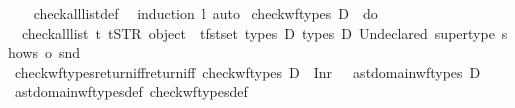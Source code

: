 \begin{isabellebody}
%
\isadelimproof
\ \ %
\endisadelimproof
%
\isatagproof
{}\isamarkupfalse%
\ check{\isacharunderscore}{\kern0pt}all{\isacharunderscore}{\kern0pt}list{\isacharunderscore}{\kern0pt}def\ \isamarkupfalse%
\ {\isacharparenleft}{\kern0pt}induction\ l{\isacharparenright}{\kern0pt}\ {\isacharparenleft}{\kern0pt}auto{\isacharparenright}{\kern0pt}%
\endisatagproof
{\isafoldproof}%
%
\isadelimproof
\isanewline
%
\endisadelimproof
\isanewline
{}\isamarkupfalse%
\ {\isachardoublequoteopen}check{\isacharunderscore}{\kern0pt}wf{\isacharunderscore}{\kern0pt}types\ D\ {\isasymequiv}\ do\ {\isacharbraceleft}{\kern0pt}\isanewline
\ \ check{\isacharunderscore}{\kern0pt}all{\isacharunderscore}{\kern0pt}list\ {\isacharparenleft}{\kern0pt}{\isasymlambda}{\isacharparenleft}{\kern0pt}{\isacharunderscore}{\kern0pt}{\isacharcomma}{\kern0pt}t{\isacharparenright}{\kern0pt}{\isachardot}{\kern0pt}\ t{\isacharequal}{\kern0pt}{\isacharparenleft}{\kern0pt}STR\ {\isacharprime}{\kern0pt}{\isacharprime}{\kern0pt}object{\isacharprime}{\kern0pt}{\isacharprime}{\kern0pt}{\isacharparenright}{\kern0pt}\ {\isasymor}\ t{\isasymin}fst{\isacharbackquote}{\kern0pt}set\ {\isacharparenleft}{\kern0pt}types\ D{\isacharparenright}{\kern0pt}{\isacharparenright}{\kern0pt}\ {\isacharparenleft}{\kern0pt}types\ D{\isacharparenright}{\kern0pt}\ {\isacharprime}{\kern0pt}{\isacharprime}{\kern0pt}Undeclared\ supertype{\isacharprime}{\kern0pt}{\isacharprime}{\kern0pt}\ {\isacharparenleft}{\kern0pt}shows\ o\ snd{\isacharparenright}{\kern0pt}\isanewline
{\isacharbraceright}{\kern0pt}{\isachardoublequoteclose}\isanewline
\isanewline
{}\isamarkupfalse%
\ check{\isacharunderscore}{\kern0pt}wf{\isacharunderscore}{\kern0pt}types{\isacharunderscore}{\kern0pt}return{\isacharunderscore}{\kern0pt}iff{\isacharbrackleft}{\kern0pt}return{\isacharunderscore}{\kern0pt}iff{\isacharbrackright}{\kern0pt}{\isacharcolon}{\kern0pt}\ {\isachardoublequoteopen}check{\isacharunderscore}{\kern0pt}wf{\isacharunderscore}{\kern0pt}types\ D\ {\isacharequal}{\kern0pt}\ Inr\ {\isacharparenleft}{\kern0pt}{\isacharparenright}{\kern0pt}\ {\isasymlongleftrightarrow}\ ast{\isacharunderscore}{\kern0pt}domain{\isachardot}{\kern0pt}wf{\isacharunderscore}{\kern0pt}types\ D{\isachardoublequoteclose}\isanewline
%
\isadelimproof
\ \ %
\endisadelimproof
%
\isatagproof
{}\isamarkupfalse%
\ ast{\isacharunderscore}{\kern0pt}domain{\isachardot}{\kern0pt}wf{\isacharunderscore}{\kern0pt}types{\isacharunderscore}{\kern0pt}def\ check{\isacharunderscore}{\kern0pt}wf{\isacharunderscore}{\kern0pt}types{\isacharunderscore}{\kern0pt}def\ \isamarkupfalse%

\end{isabellebody}
